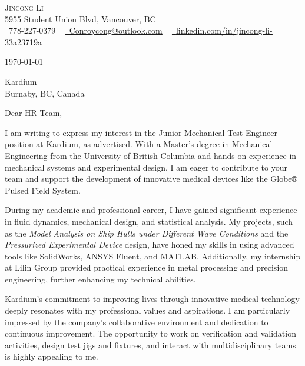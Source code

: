 \documentclass[letterpaper,11pt]{article}
\begin{document}
\begin{center}
    {\Huge \scshape Jincong Li} \\ \vspace{1pt}
    5955 Student Union Blvd, Vancouver, BC \\ \vspace{1pt}
    \small \raisebox{-0.1\height}\faPhone\ 778-227-0379 ~ \href{mailto:Conroycong@outlook.com}{\raisebox{-0.2\height}\faEnvelope\ \underline{Conroycong@outlook.com}} ~ 
    \href{https://linkedin.com/in/jincong-li-33a23719a/}{\raisebox{-0.2\height}\faLinkedin\ \underline{linkedin.com/in/jincong-li-33a23719a}}  ~
    \vspace{-8pt}
\end{center}

\begin{flushright}
\today \\
\end{flushright}


Kardium \\
Burnaby, BC, Canada

Dear HR Team,

I am writing to express my interest in the Junior Mechanical Test Engineer position at Kardium, as advertised. With a Master’s degree in Mechanical Engineering from the University of British Columbia and hands-on experience in mechanical systems and experimental design, I am eager to contribute to your team and support the development of innovative medical devices like the Globe® Pulsed Field System.

During my academic and professional career, I have gained significant experience in fluid dynamics, mechanical design, and statistical analysis. My projects, such as the \textit{Model Analysis on Ship Hulls under Different Wave Conditions} and the \textit{Pressurized Experimental Device} design, have honed my skills in using advanced tools like SolidWorks, ANSYS Fluent, and MATLAB. Additionally, my internship at Lilin Group provided practical experience in metal processing and precision engineering, further enhancing my technical abilities.

Kardium’s commitment to improving lives through innovative medical technology deeply resonates with my professional values and aspirations. I am particularly impressed by the company’s collaborative environment and dedication to continuous improvement. The opportunity to work on verification and validation activities, design test jigs and fixtures, and interact with multidisciplinary teams is highly appealing to me.
\end{document}
